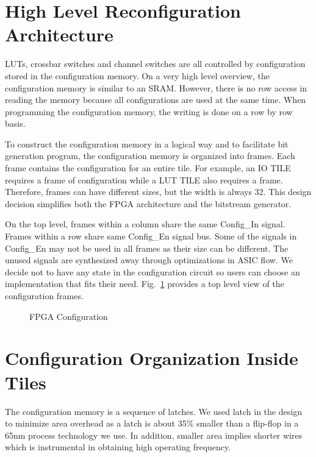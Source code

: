 \section{High Level Reconfiguration Architecture}
\label{sec:reconf_hl}

LUTs, crossbar switches and channel switches are all controlled by
configuration stored in the configuration memory. On a very high level
overview, the configuration memory is similar to an SRAM. However,
there is no row access in reading the memory because all configurations are
used at the same time. When programming the configuration memory, the writing
is done on a row by row basis.  \par

To construct the configuration memory in a logical way and to facilitate
bit generation program, the configuration memory is organized into frames. Each
frame contains the configuration for an entire tile. For example, an IO TILE requires
a frame of configuration while a LUT TILE also requires a frame. Therefore, frames can 
have different sizes, but the width is always 32. This design decision simplifies both 
the FPGA architecture and the bitstream generator. \par

On the top level, frames within a column share the same Config\_In signal. 
Frames within a row share same Config\_En signal bus. Some of the signals in Config\_En 
may not be used in all frames as their size can be different. The unused signals
are synthesized away through optimizations in ASIC flow. 
We decide not to have any state in the configuration circuit so users 
can choose an implementation that fits their need. Fig.~\ref{fig:fpga_reconfig} provides a 
top level view of the configuration frames. \par

\begin{figure}[htp]
	\begin{center}
		\epsfxsize=2.8in
		    \renewcommand{\captionfont}{\small}
				\caption{FPGA Configuration
				\label{fig:fpga_reconfig}}
	\end{center}
\end{figure}

\section{Configuration Organization Inside Tiles}
\label{sec:config_tiles}

The configuration memory is a sequence of latches. We used latch in the design to
minimize area overhead as a latch is about 35\% smaller than a flip-flop in a 
65nm process technology we use. In addition, smaller area implies shorter wires
which is instrumental in obtaining high operating frequency. \par

